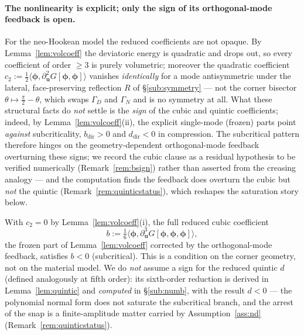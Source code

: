 \paragraph{The nonlinearity is explicit; only the sign of its orthogonal-mode feedback is open.}
For the neo-Hookean model the reduced coefficients are not opaque. By Lemma~\ref{lem:volcoeff} the deviatoric energy is
quadratic and drops out, so every coefficient of order $\ge3$ is purely volumetric; moreover the quadratic coefficient
$c_2:=\tfrac12\langle\bm{\phi},\partial^2_{\bm{u}}G[\bm{\phi},\bm{\phi}]\rangle$ vanishes \emph{identically} for a mode
antisymmetric under the lateral, face-preserving reflection $R$ of \S\ref{sub:symmetry} --- not the corner bisector
$\theta\mapsto\tfrac\pi2-\theta$, which swaps $\Gamma_D$ and $\Gamma_N$ and is no symmetry at all. What these
structural facts do \emph{not} settle is the \emph{sign} of the cubic and quintic coefficients; indeed, by
Lemma~\ref{lem:volcoeff}(ii), the explicit single-mode (frozen) parts point \emph{against} subcriticality,
$b_{\mathrm{dir}}>0$ and $d_{\mathrm{dir}}<0$ in compression. The subcritical pattern therefore hinges on the
geometry-dependent orthogonal-mode feedback overturning these signs; we record the cubic clause as a residual
hypothesis to be verified numerically (Remark~\ref{rem:bsign}) rather than asserted from the creasing analogy
\cite{Biot1963,Hong2009} --- and the computation finds the feedback does overturn the cubic but \emph{not} the
quintic (Remark~\ref{rem:quinticstatus}), which reshapes the saturation story below.
\begin{assumption}
    \label{ass:subcrit}
    With $c_2=0$ by Lemma~\ref{lem:volcoeff}(i), the full reduced cubic coefficient
    \begin{equation}
        b:=\tfrac16\langle\bm{\phi},\partial^3_{\bm{u}}G[\bm{\phi},\bm{\phi},\bm{\phi}]\rangle,
    \end{equation}
    the frozen part of Lemma~\ref{lem:volcoeff} corrected by the orthogonal-mode feedback, satisfies $b<0$
    (subcritical). This is a condition on the corner geometry, not on the material model. We do \emph{not} assume a
    sign for the reduced quintic $d$ (defined analogously at fifth order): its sixth-order reduction is derived in
    Lemma~\ref{lem:quintic} and \emph{computed} in \S\ref{sub:numb}, with the result $d<0$ --- the polynomial normal
    form does not saturate the subcritical branch, and the arrest of the snap is a finite-amplitude matter carried by
    Assumption~\ref{ass:nd} (Remark~\ref{rem:quinticstatus}).
\end{assumption}

